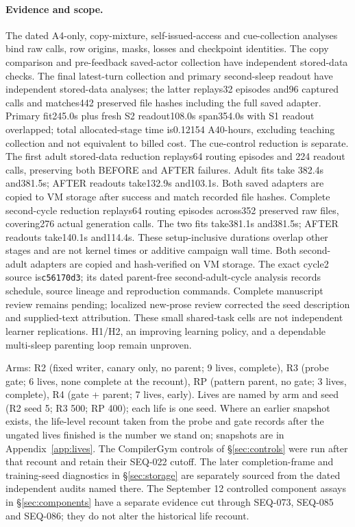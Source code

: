 \documentclass{article}
\begin{document}
\paragraph{Evidence and scope.}
The dated A4-only, copy-mixture, self-issued-access and cue-collection analyses
bind raw calls, row origins, masks, losses and checkpoint identities. The copy
comparison and pre-feedback saved-actor collection have independent stored-data
checks. The final latest-turn collection and primary second-sleep readout have
independent stored-data analyses; the latter replays32 episodes and96 captured
calls and matches442 preserved file hashes including the full saved adapter.
Primary fit245.0s plus fresh S2 readout108.0s span354.0s with S1 readout
overlapped; total allocated-stage time is0.12154 A40-hours, excluding teaching
collection and not equivalent to billed cost. The cue-control reduction is
separate. The first adult stored-data reduction replays64 routing episodes and
224 readout calls, preserving both BEFORE and AFTER failures. Adult fits take
382.4s and381.5s; AFTER readouts take132.9s and103.1s. Both saved adapters are
copied to VM storage after success and match recorded file hashes. Complete
second-cycle reduction replays64 routing episodes across352 preserved raw
files, covering276 actual generation calls. The two fits take381.1s and381.5s;
AFTER readouts take140.1s and114.4s. These setup-inclusive durations overlap
other stages and are not kernel times or additive campaign wall time. Both
second-adult adapters are copied and hash-verified on VM storage. The exact
cycle2 source is\texttt{c56170d3}; its dated parent-free second-adult-cycle
analysis records schedule, source lineage and reproduction commands. Complete
manuscript review remains pending; localized new-prose review corrected the
seed description and supplied-text attribution.
These small shared-task cells are not independent
learner replications. H1/H2, an improving learning policy, and a dependable
multi-sleep parenting loop remain unproven.
\label{sec:results}

Arms: R2 (fixed writer, canary only, no parent; 9 lives, complete), R3 (probe gate; 6 lives, none complete at the recount), RP (pattern parent, no gate; 3 lives, complete), R4 (gate + parent; 7 lives, early). Lives are named by arm and seed (R2 seed 5; R3 500; RP 400); each life is one seed. Where an earlier snapshot exists, the life-level recount taken from the probe and gate records after the ungated lives finished is the number we stand on; snapshots are in Appendix~\ref{app:lives}. The CompilerGym controls of \S\ref{sec:controls} were run after that recount and retain their SEQ-022 cutoff. The later completion-frame and training-seed diagnostics in \S\ref{sec:storage} are separately sourced from the dated independent audits named there. The September 12 controlled component assays in \S\ref{sec:components} have a separate evidence cut through SEQ-073, SEQ-085 and SEQ-086; they do not alter the historical life recount. %
\end{document}
